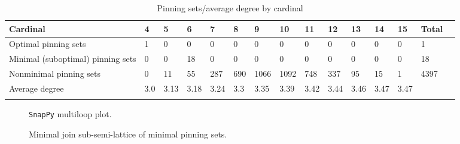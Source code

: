 \documentclass{article}%
\begin{document}
\begin{table}[ht]
	\caption{Pinning sets/average degree by cardinal}
	\centering
	\renewcommand{\arraystretch}{1.5}
	\begin{tabularx}{\textwidth}{lXXXXXXXXXXXXXX}
		\toprule
			Cardinal & 4 & 5 & 6 & 7 & 8 & 9 & 10 & 11 & 12 & 13 & 14 & 15 & Total\\
			\hline
			Optimal pinning sets & 1 & 0 & 0 & 0 & 0 & 0 & 0 & 0 & 0 & 0 & 0 & 0 & 1 \\
			Minimal (suboptimal) pinning sets & 0 & 0 & 18 & 0 & 0 & 0 & 0 & 0 & 0 & 0 & 0 & 0 & 18 \\
			Nonminimal pinning sets & 0 & 11 & 55 & 287 & 690 & 1066 & 1092 & 748 & 337 & 95 & 15 & 1 & 4397 \\
			Average degree & 3.0 & 3.13 & 3.18 & 3.24 & 3.3 & 3.35 & 3.39 & 3.42 & 3.44 & 3.46 & 3.47 & 3.47 &  \\
		\bottomrule \\ 
	\end{tabularx}
\end{table}

\begin{multicols}{2}
\begin{figure}[H]
\centering

\caption{\texttt{SnapPy} multiloop plot.}
\label{fig:tex/img/[[10, 14, 1, 11], [11, 15, 12, 22], [9, 17, 10, 18], [13, 16, 14, 17], [1, 16, 2, 15], [12, 2, 13, 3], [21, 7, 22, 8], [18, 23, 19, 26], [8, 3, 9, 4], [20, 24, 21, 25], [6, 23, 7, 24], [19, 6, 20, 5],.svg}
\end{figure}
\columnbreak

\begin{figure}[H]
\centering
\scalebox{0.8}{}
\caption{Minimal join sub-semi-lattice of minimal pinning sets.}
\label{fig:tex/img/[[10, 14, 1, 11], [11, 15, 12, 22], [9, 17, 10, 18], [13, 16, 14, 17], [1, 16, 2, 15], [12, 2, 13, 3], [21, 7, 22, 8], [18, 23, 19, 26], [8, 3, 9, 4], [20, 24, 21, 25], [6, 23, 7, 24], [19, 6, 20, 5],.pgf}
\end{figure}
\end{multicols}
\end{document}
